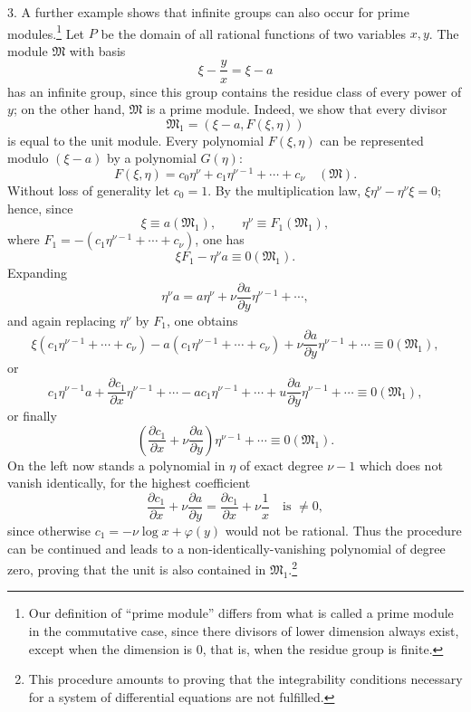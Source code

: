 \documentclass[11pt]{article}
\begin{document}
3. A further example shows that infinite groups can also occur for prime modules.\footnote{Our definition of ``prime module'' differs from what is called a prime module in the commutative case, since there divisors of lower dimension always exist, except when the dimension is $0$, that is, when the residue group is finite.} Let $P$ be the domain of all rational functions of two variables $x,y$. The module $\mathfrak M$ with basis
\[
 \xi-\frac{y}{x}=\xi-a
\]
has an infinite group, since this group contains the residue class of every power of $y$; on the other hand, $\mathfrak M$ is a prime module. Indeed, we show that every divisor
\[
 \mathfrak M_1=(\xi-a,
F(\xi,\eta))
\]
is equal to the unit module. Every polynomial $F(\xi,
\eta)$ can be represented modulo $(\xi-a)$ by a polynomial $G(\eta)$:
\[
 F(\xi,
\eta)=c_0\eta^\nu+c_1\eta^{\nu-1}+\cdots+c_\nu\quad(\mathfrak M).
\]
Without loss of generality let $c_0=1$. By the multiplication law, $\xi\eta^\nu-\eta^\nu\xi=0$; hence, since
\[
 \xi\equiv a(\mathfrak M_1),
 \qquad
 \eta^\nu\equiv F_1(\mathfrak M_1),
\]
where $F_1=-(c_1\eta^{\nu-1}+\cdots+c_\nu)$, one has
\[
 \xi F_1-\eta^\nu a\equiv0(\mathfrak M_1).
\]
Expanding
\[
 \eta^\nu a=a\eta^\nu+\nu\frac{\partial a}{\partial y}\eta^{\nu-1}+\cdots,
\]
and again replacing $\eta^\nu$ by $F_1$, one obtains
\[
 \xi(c_1\eta^{\nu-1}+\cdots+c_\nu)-a(c_1\eta^{\nu-1}+\cdots+c_\nu)
 +\nu\frac{\partial a}{\partial y}\eta^{\nu-1}+\cdots\equiv0(\mathfrak M_1),
\]
or
\[
 c_1\eta^{\nu-1}a+\frac{\partial c_1}{\partial x}\eta^{\nu-1}+\cdots
 -ac_1\eta^{\nu-1}+\cdots+
u\frac{\partial a}{\partial y}\eta^{\nu-1}+\cdots
 \equiv0(\mathfrak M_1),
\]
or finally
\[
 \left(\frac{\partial c_1}{\partial x}+\nu\frac{\partial a}{\partial y}\right)\eta^{\nu-1}+\cdots
 \equiv0(\mathfrak M_1).
\]
On the left now stands a polynomial in $\eta$ of exact degree $\nu-1$ which does not vanish identically, for the highest coefficient
\[
 \frac{\partial c_1}{\partial x}+\nu\frac{\partial a}{\partial y}
 =\frac{\partial c_1}{\partial x}+\nu\frac{1}{x}
 \quad\text{is }\ne0,
\]
since otherwise $c_1=-\nu\log x+\varphi(y)$ would not be rational. Thus the procedure can be continued and leads to a non-identically-vanishing polynomial of degree zero, proving that the unit is also contained in $\mathfrak M_1$.\footnote{This procedure amounts to proving that the integrability conditions necessary for a system of differential equations are not fulfilled.}
\end{document}
